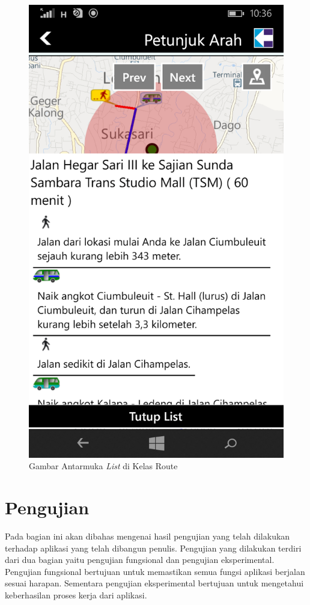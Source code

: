 	\begin{figure}[!h]
		\centering
			\includegraphics[scale=0.2]{Gambar/antarmuka/list_route}
		\caption{Gambar Antarmuka \textit{List} di Kelas Route}
		\label{fig:antarmuka list Route}
	\end{figure}

\newpage

\section{Pengujian}
\label{lab:Pengujian}
\hspace{0.5cm} Pada bagian ini akan dibahas mengenai hasil pengujian yang telah dilakukan terhadap aplikasi yang telah dibangun penulis. Pengujian yang dilakukan terdiri dari dua bagian yaitu pengujian fungsional dan pengujian eksperimental. Pengujian fungsional bertujuan untuk memastikan semua fungsi aplikasi berjalan sesuai harapan. Sementara pengujian eksperimental bertujuan untuk mengetahui keberhasilan proses kerja dari aplikasi.

